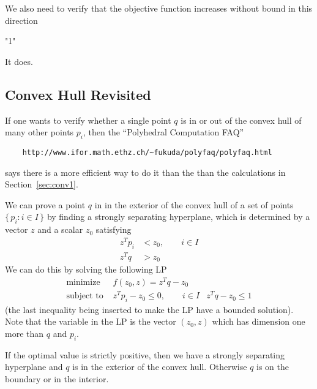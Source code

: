 \documentclass{article}
\newcommand{\set}[1]{\{\, #1 \,\}}
\begin{document}
We also need to verify that the objective function increases without
bound in this direction
\begin{Schunk}
\begin{Soutput}
[1] "1"
\end{Soutput}
\end{Schunk}
It does.

\subsection{Convex Hull Revisited} \label{sec:conv2}

If one wants to verify whether a single point $q$ is in or out
of the convex hull of many other points $p_i$, then the
``Polyhedral Computation FAQ''
\begin{verbatim}
    http://www.ifor.math.ethz.ch/~fukuda/polyfaq/polyfaq.html
\end{verbatim}
says there is a more efficient way to do it than the
than the calculations in Section~\ref{sec:conv1}.

We can prove a point $q$ in in the exterior of the convex hull of
a set of points $\set{ p_i : i \in I }$ by finding a strongly separating
hyperplane, which is determined by a vector $z$ and a scalar $z_0$
satisfying
\begin{align*}
    z^T p_i & < z_0, \qquad i \in I
    \\
    z^T q & > z_0
\end{align*}
We can do this by solving the following LP
\begin{align*}
    \text{minimize} & f(z_0, z) = z^T q - z_0
    \\
    \text{subject to } & z^T p_i - z_0 \le 0, \qquad i \in I
                       & z^T q - z_0 \le 1
\end{align*}
(the last inequality being inserted to make the LP have
a bounded solution).  Note that the variable in the LP is the
vector $(z_0, z)$ which has dimension one more than $q$ and $p_i$.

If the optimal value is strictly positive, then
we have a strongly separating hyperplane and $q$ is in the exterior of
the convex hull.
Otherwise $q$ is on the boundary or in the interior.
\end{document}
